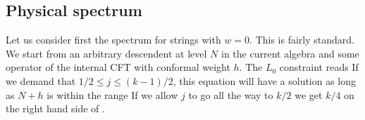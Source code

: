 \subsection{Physical spectrum}

Let us consider first the spectrum for strings with $w=0$. 
This is fairly standard. We start from an arbitrary descendent
at level $N$ in the current algebra and some operator of the internal
CFT with conformal weight $h$. 
The $L_0$ constraint reads
If we demand that $ 1/2 \leq j \leq (k-1)/2$,
this equation will have a solution as long as $N +h$ is within the range
If we allow $j$ to go all the way to $k/2$ we get $k/4$ on  the right
hand side of \range . 


